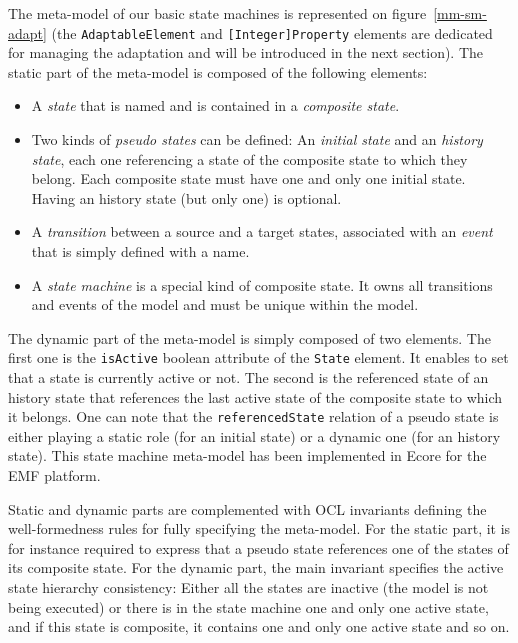 \documentclass[english, 10pt]{llncs}
\begin{document}
The meta-model of our basic state machines is represented on
figure~\ref{mm-sm-adapt} (the \texttt{AdaptableElement} and
\texttt{[Integer]Property} elements are dedicated for managing the
adaptation and will be introduced in the next section). The static
part of the meta-model is composed of the following elements:
\begin{itemize}
\item A \textit{state} that is named and is contained in a
  \textit{composite state}.

\item Two kinds of \textit{pseudo states} can be defined: An
  \textit{initial state} and an \textit{history state}, each one
  referencing a state of the composite state to which they
  belong. Each composite state must have one and only one initial
  state. Having an history state (but only one) is optional.

\item A \textit{transition} between a source and a target states,
  associated with an \textit{event} that is simply defined with a
  name.

\item A \textit{state machine} is a special kind of composite
  state. It owns all transitions and events of the model and must be
  unique within the model.

\end{itemize}

The dynamic part of the meta-model is simply composed of two
elements. The first one is the \texttt{isActive} boolean attribute of
the \texttt{State} element. It enables to set that a state is
currently active or not. The second is the referenced state of an
history state that references the last active state of the composite
state to which it belongs. One can note that the
\texttt{referencedState} relation of a pseudo state is either playing
a static role (for an initial state) or a dynamic one (for an history
state). This state machine meta-model has been implemented in Ecore
for the EMF platform.

Static and dynamic parts are complemented with OCL invariants defining
the well-formedness rules for fully specifying the meta-model. For the
static part, it is for instance required to express that a pseudo
state references one of the states of its composite state. For the
dynamic part, the main invariant specifies the active state hierarchy
consistency: Either all the states are inactive (the model is not
being executed) or there is in the state machine one and only one
active state, and if this state is composite, it contains one and only
one active state and so on.
\end{document}

